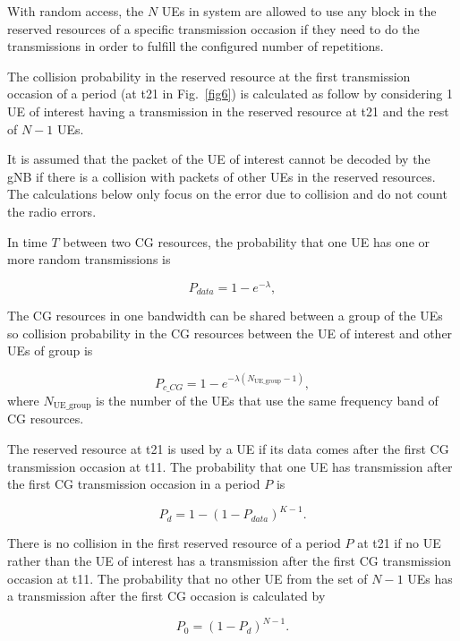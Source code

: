 \documentclass{ieeeaccess}
\begin{document}
With random access, the $N$ UEs in system are allowed to use any block in the reserved resources of a specific transmission occasion if they need to do the transmissions in order to fulfill the configured number of repetitions.

The collision probability in the reserved resource at the first transmission occasion of a period (at t21 in Fig.~\ref{fig6}) is calculated as follow by considering 1 UE of interest having a transmission in the reserved resource at t21 and the rest of $N-1$ UEs.

It is assumed that the packet of the UE of interest cannot be decoded by the gNB if there is a collision with packets of other UEs in the reserved resources. The calculations below only focus on the error due to collision and do not count the radio errors.

In time $T$ between two CG resources, the probability that one UE has one or more random transmissions is

\begin{equation}
P_{data} = 1 - e^{-\lambda},\label{eq1}
\end{equation}

The CG resources in one bandwidth can be shared between a group of the UEs so collision probability in the CG resources between the UE of interest and other UEs of group is 

\begin{equation}
P_{c\_CG} = 1 - e^{-\lambda(N_\mathrm{UE\_group}-1)},\label{eq2}
\end{equation}
where $N_\mathrm{UE\_group}$ is the number of the UEs that use the same frequency band of CG resources.

The reserved resource at t21 is used by a UE if its data comes after the first CG transmission occasion at t11. The probability that one UE has transmission after the first CG transmission occasion in a period $P$ is 

\begin{equation}
P_{d} = 1 - (1-P_{data})^{K-1}.\label{eq3}
\end{equation}

There is no collision in the first reserved resource of a period $P$ at t21 if no UE rather than the UE of interest has a transmission after the first CG transmission occasion at t11. The probability that no other UE from the set of $N-1$ UEs has a transmission after the first CG occasion is calculated by 

\begin{equation}
P_{0} = (1-P_{d})^{N-1}.\label{eq4}
\end{equation}
\end{document}
